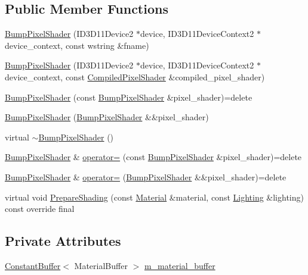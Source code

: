 \subsection*{Public Member Functions}
\begin{DoxyCompactItemize}
\item 
\hyperlink{classmage_1_1_bump_pixel_shader_a869f9e7c406079612eeac9885c0fc201}{Bump\+Pixel\+Shader} (I\+D3\+D11\+Device2 $\ast$device, I\+D3\+D11\+Device\+Context2 $\ast$device\+\_\+context, const wstring \&fname)
\item 
\hyperlink{classmage_1_1_bump_pixel_shader_abe9362661f862ea169b191c4d22d8c4d}{Bump\+Pixel\+Shader} (I\+D3\+D11\+Device2 $\ast$device, I\+D3\+D11\+Device\+Context2 $\ast$device\+\_\+context, const \hyperlink{structmage_1_1_compiled_pixel_shader}{Compiled\+Pixel\+Shader} \&compiled\+\_\+pixel\+\_\+shader)
\item 
\hyperlink{classmage_1_1_bump_pixel_shader_ae2442bfecc38813e11c0fb81b1b56205}{Bump\+Pixel\+Shader} (const \hyperlink{classmage_1_1_bump_pixel_shader}{Bump\+Pixel\+Shader} \&pixel\+\_\+shader)=delete
\item 
\hyperlink{classmage_1_1_bump_pixel_shader_a01db1b284501b163419bf50ed9997b81}{Bump\+Pixel\+Shader} (\hyperlink{classmage_1_1_bump_pixel_shader}{Bump\+Pixel\+Shader} \&\&pixel\+\_\+shader)
\item 
virtual \hyperlink{classmage_1_1_bump_pixel_shader_a73fde1c65d4e8e29795247a43a31926b}{$\sim$\+Bump\+Pixel\+Shader} ()
\item 
\hyperlink{classmage_1_1_bump_pixel_shader}{Bump\+Pixel\+Shader} \& \hyperlink{classmage_1_1_bump_pixel_shader_a9f9112ec617a7de6b6bd1272c8be42da}{operator=} (const \hyperlink{classmage_1_1_bump_pixel_shader}{Bump\+Pixel\+Shader} \&pixel\+\_\+shader)=delete
\item 
\hyperlink{classmage_1_1_bump_pixel_shader}{Bump\+Pixel\+Shader} \& \hyperlink{classmage_1_1_bump_pixel_shader_acebedf6bcce2d9f764ac807bc9456ede}{operator=} (\hyperlink{classmage_1_1_bump_pixel_shader}{Bump\+Pixel\+Shader} \&\&pixel\+\_\+shader)=delete
\item 
virtual void \hyperlink{classmage_1_1_bump_pixel_shader_aa365b87ca4860c58048ee1a119b4b668}{Prepare\+Shading} (const \hyperlink{structmage_1_1_material}{Material} \&material, const \hyperlink{structmage_1_1_lighting}{Lighting} \&lighting) const override final
\end{DoxyCompactItemize}
\subsection*{Private Attributes}
\begin{DoxyCompactItemize}
\item 
\hyperlink{structmage_1_1_constant_buffer}{Constant\+Buffer}$<$ Material\+Buffer $>$ \hyperlink{classmage_1_1_bump_pixel_shader_a0f586036023158b6234ff4d6d36b4e02}{m\+\_\+material\+\_\+buffer}
\end{DoxyCompactItemize}
